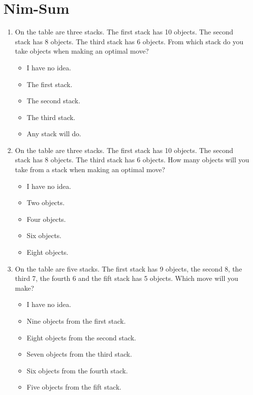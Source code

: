 \section{Nim-Sum}
\begin{framed}
\begin{enumerate}
	\item On the table are three stacks. The first stack has 10 objects. The
		second stack has 8 objects. The third stack has 6 objects. From which
		stack do you take objects when making an optimal move?
		\begin{itemize}
			\item I have no idea.
			\item The first stack.
			\item The second stack.
			\item The third stack.
			\item Any stack will do.
		\end{itemize}
	\item On the table are three stacks. The first stack has 10 objects. The
		second stack has 8 objects. The third stack has 6 objects. How many
		objects will you take from a stack when making an optimal move?
		\begin{itemize}
			\item I have no idea.
			\item Two objects.
			\item Four objects.
			\item Six objects.
			\item Eight objects.
		\end{itemize}
	\item On the table are five stacks. The first stack has 9 objects, the
		second 8, the third 7, the fourth 6 and the fift stack has 5 objects.
		Which move will you make?
		\begin{itemize}
			\item I have no idea.
			\item Nine objects from the first stack.
			\item Eight objects from the second stack.
			\item Seven objects from the third stack.
			\item Six objects from the fourth stack.
			\item Five objects from the fift stack.
		\end{itemize}
\end{enumerate}
\end{framed}
